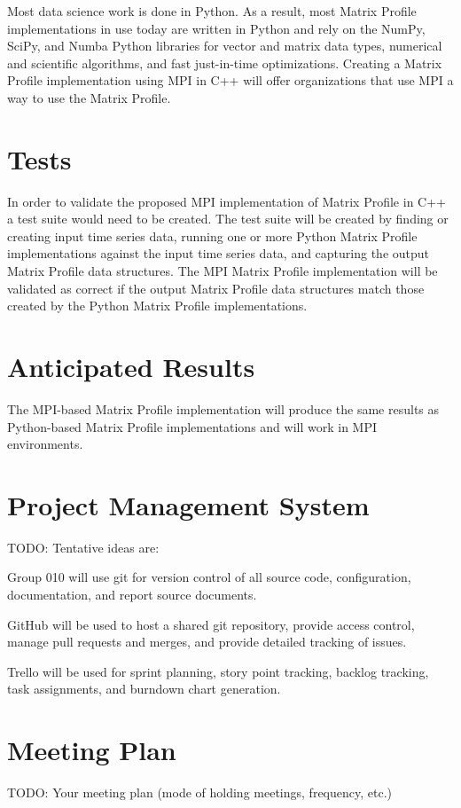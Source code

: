 \documentclass[conference]{IEEEtran}
\begin{document}
Most data science work is done in Python.  As a result, most Matrix Profile implementations in use today are written in Python \cite{Stumpy} and rely on the NumPy, SciPy, and Numba Python libraries for vector and matrix data types, numerical and scientific algorithms, and fast just-in-time optimizations.  Creating a Matrix Profile implementation using MPI in C++ will offer organizations that use MPI a way to use the Matrix Profile. 

\section{Tests}
In order to validate the proposed MPI implementation of Matrix Profile in C++ a test suite would need to be created.  The test suite will be created by finding or creating input time series data, running one or more Python Matrix Profile implementations against the input time series data, and capturing the output Matrix Profile data structures.  The MPI Matrix Profile implementation will be validated as correct if the output Matrix Profile data structures match those created by the Python Matrix Profile implementations. 

\section{Anticipated Results}
The MPI-based Matrix Profile implementation will produce the same results as Python-based Matrix Profile implementations and will work in MPI environments.

\section{Project Management System}
TODO:  Tentative ideas are:

Group 010 will use git for version control of all source code, configuration, documentation, and report source documents.  

GitHub will be used to host a shared git repository, provide access control, manage pull requests and merges, and provide detailed tracking of issues.

Trello will be used for sprint planning, story point tracking, backlog tracking, task assignments, and burndown chart generation. 

\section{Meeting Plan}
TODO: Your meeting plan (mode of holding meetings, frequency, etc.)
\end{document}
